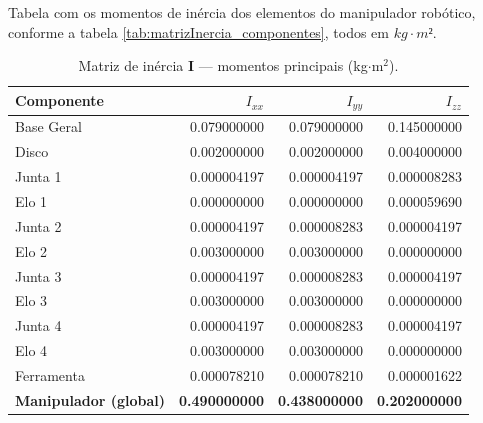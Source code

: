 Tabela com os momentos de inércia dos elementos do manipulador robótico, conforme a tabela \ref{tab:matrizInercia_componentes}, todos em $kg·m²$.

\begin{table}[h]
\centering
\footnotesize
\caption{Matriz de inércia $\mathbf{I}$ — momentos principais (kg$\cdot$m$^{2}$).}
\label{tab:mi_principais}
\begin{tabular}{lrrr}
\hline
Componente & $I_{xx}$ & $I_{yy}$ & $I_{zz}$ \\
\hline
Base Geral         & 0.079000000 & 0.079000000 & 0.145000000 \\
Disco              & 0.002000000 & 0.002000000 & 0.004000000 \\
Junta 1            & 0.000004197 & 0.000004197 & 0.000008283 \\
Elo 1              & 0.000000000 & 0.000000000 & 0.000059690 \\
Junta 2            & 0.000004197 & 0.000008283 & 0.000004197 \\
Elo 2              & 0.003000000 & 0.003000000 & 0.000000000 \\
Junta 3            & 0.000004197 & 0.000008283 & 0.000004197 \\
Elo 3              & 0.003000000 & 0.003000000 & 0.000000000 \\
Junta 4            & 0.000004197 & 0.000008283 & 0.000004197 \\
Elo 4              & 0.003000000 & 0.003000000 & 0.000000000 \\
Ferramenta         & 0.000078210 & 0.000078210 & 0.000001622 \\
\hline
\textbf{Manipulador (global)} & \textbf{0.490000000} & \textbf{0.438000000} & \textbf{0.202000000} \\
\hline
\end{tabular}
\end{table}

